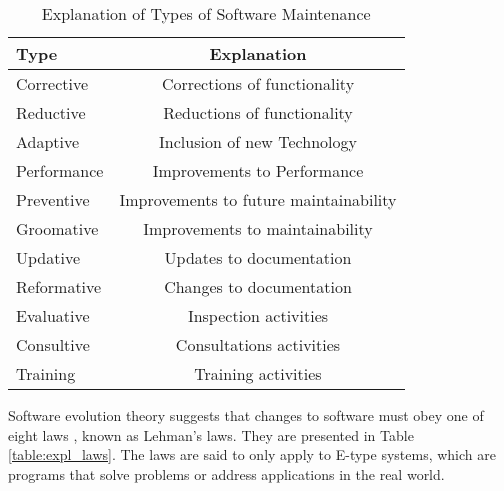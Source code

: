 \documentclass{sig-alternate}
\begin{document}
\begin{table}
       \centering
       \begin{tabular}[ht]{l|c}
              \toprule

              \textbf{Type}                              & \textbf{Explanation}    \\ \midrule
              Corrective    & Corrections of functionality                   \\ \hline
              Reductive     & Reductions of functionality                    \\ \hline
              Adaptive      & Inclusion of new Technology                    \\ \hline
              Performance   & Improvements to Performance                    \\ \hline
              Preventive    & Improvements to future maintainability         \\ \hline
              Groomative    & Improvements to maintainability                \\ \hline
              Updative      & Updates to documentation                       \\ \hline
              Reformative   & Changes to documentation                       \\ \hline
              Evaluative    & Inspection activities                          \\ \hline
              Consultive    & Consultations activities                       \\ \hline
              Training      & Training activities                            \\ 

              \bottomrule

       \end{tabular}
       \caption{Explanation of Types of Software Maintenance}
       \label{table:expl_types}
\end{table}

Software evolution theory suggests that changes to software must obey one of eight laws \cite{lehman90sview}, known as Lehman's laws. They are presented in Table \ref{table:expl_laws}. The laws are said to only apply to E-type systems, which are programs that solve problems or address applications in the real world.     
\end{document}
